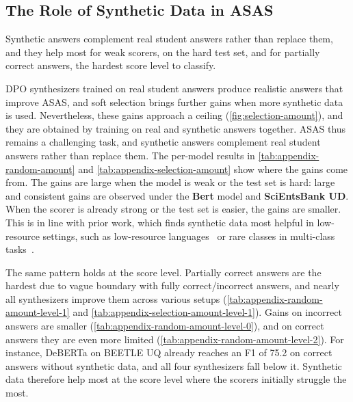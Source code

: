 \subsection{The Role of Synthetic Data in ASAS}

\vspace{0.5ex}
\noindent\colorbox{gray!15}{\parbox{\dimexpr\linewidth-2\fboxsep\relax}{%
Synthetic answers complement real student answers rather than replace them, and they help most for weak scorers, on the hard test set, and for partially correct answers, the hardest score level to classify.}}

DPO synthesizers trained on real student answers produce realistic answers that improve ASAS, and soft selection brings further gains when more synthetic data is used. Nevertheless, these gains approach a ceiling (\autoref{fig:selection-amount}), and they are obtained by training on real and synthetic answers together. ASAS thus remains a challenging task, and synthetic answers complement real student answers rather than replace them. The per-model results in \autoref{tab:appendix-random-amount} and \autoref{tab:appendix-selection-amount} show where the gains come from. The gains are large when the model is weak or the test set is hard: 
large and consistent gains are observed under the \textbf{Bert} model and \textbf{SciEntsBank UD}. When the scorer is already strong or the test set is easier, the gains are smaller. This is in line with prior work, which finds synthetic data most helpful in low-resource settings, such as low-resource languages~\citep{pecherBetterGeneratorsClassifiers2026} or rare classes in multi-class tasks~\citep{mollerParrotDilemmaHumanLabeled2024}.

The same pattern holds at the score level. Partially correct answers are the hardest due to vague boundary with fully correct/incorrect answers, and nearly all synthesizers improve them across various setups (\autoref{tab:appendix-random-amount-level-1} and \autoref{tab:appendix-selection-amount-level-1}). Gains on incorrect answers are smaller (\autoref{tab:appendix-random-amount-level-0}), and on correct answers they are even more limited (\autoref{tab:appendix-random-amount-level-2}). For instance, DeBERTa on BEETLE UQ already reaches an F1 of 75.2 on correct answers without synthetic data, and all four synthesizers fall below it. Synthetic data therefore help most at the score level where the scorers initially struggle the most.
